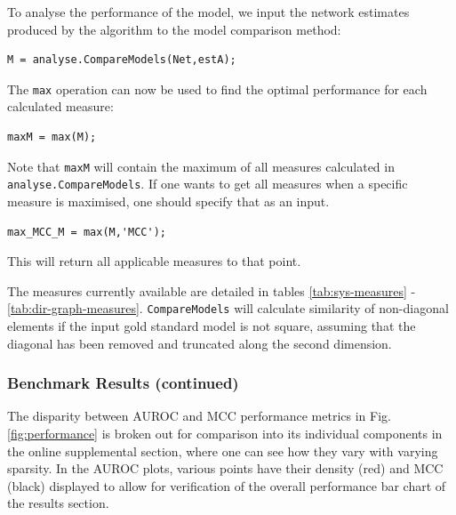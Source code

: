 \begin{bibunit}
To analyse the performance of the model, we input the network estimates produced by the algorithm to the model comparison method:
\begin{verbatim}
M = analyse.CompareModels(Net,estA);
\end{verbatim}
The \texttt{max} operation can now be used to find the optimal performance for each calculated measure:
\begin{verbatim}
maxM = max(M);
\end{verbatim}
Note that \texttt{maxM} will contain the maximum of all measures calculated in \texttt{analyse.CompareModels}.
If one wants to get all measures when a specific measure is maximised, one should specify that as an input.
\begin{verbatim}
max_MCC_M = max(M,'MCC');
\end{verbatim}
This will return all applicable measures to that point.

The measures currently available are detailed in tables \ref{tab:sys-measures} - \ref{tab:dir-graph-measures}.
\texttt{CompareModels} will calculate similarity of non-diagonal elements if the input gold standard model
is not square, assuming that the diagonal has been removed and
truncated along the second dimension.



\subsubsection{Benchmark Results (continued)}
\label{sec:Benchmark_Results_continued}

The disparity between AUROC and MCC performance metrics in Fig. \ref{fig:performance} is broken out for comparison into its individual components in the online supplemental section, where one can see how they vary with varying sparsity. In the AUROC plots, various points have their density (red) and MCC (black) displayed to allow for verification of the overall performance bar chart of the results section.

\putbib
\end{bibunit}